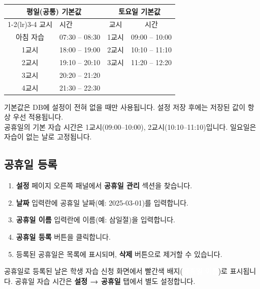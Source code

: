 \documentclass[a4paper,12pt]{article}
\newcommand{\menu}[1]{\textcolor{primary}{\textbf{#1}}}
\newcommand{\badge}[2]{\colorbox{#1}{\small\textcolor{white}{\textbf{#2}}}}
\begin{document}
\begin{center}
\begin{tabular}{clcc}
\toprule
\multicolumn{2}{c}{\textbf{평일(공통) 기본값}} & \multicolumn{2}{c}{\textbf{토요일 기본값}} \\
\cmidrule(lr){1-2}\cmidrule(lr){3-4}
교시 & 시간 & 교시 & 시간 \\
\midrule
아침 자습 & 07:30 -- 08:30 & 1교시 & 09:00 -- 10:00 \\
1교시     & 18:00 -- 19:00 & 2교시 & 10:10 -- 11:10 \\
2교시     & 19:10 -- 20:10 & 3교시 & 11:20 -- 12:20 \\
3교시     & 20:20 -- 21:20 &       &                 \\
4교시     & 21:30 -- 22:30 &       &                 \\
\bottomrule
\end{tabular}
\end{center}

\begin{notebox}
  기본값은 DB에 설정이 전혀 없을 때만 사용됩니다.
  설정 저장 후에는 저장된 값이 항상 우선 적용됩니다.\\
  공휴일의 기본 자습 시간은 1교시(09:00--10:00), 2교시(10:10--11:10)입니다.
  일요일은 자습이 없는 날로 고정됩니다.
\end{notebox}

\subsection{공휴일 등록}

\begin{enumerate}[leftmargin=1.5em]
    \item \menu{설정} 페이지 오른쪽 패널에서 \textbf{공휴일 관리} 섹션을 찾습니다.
    \item \textbf{날짜} 입력란에 공휴일 날짜(예: 2025-03-01)를 입력합니다.
    \item \textbf{공휴일 이름} 입력란에 이름(예: 삼일절)을 입력합니다.
    \item \menu{공휴일 등록} 버튼을 클릭합니다.
    \item 등록된 공휴일은 목록에 표시되며, \menu{삭제} 버튼으로 제거할 수 있습니다.
\end{enumerate}

\begin{tipbox}
  공휴일로 등록된 날은 학생 자습 신청 화면에서 빨간색 배지(\badge{danger}{공휴일 이름})로 표시됩니다.
  공휴일 자습 시간은 \menu{설정 → 공휴일} 탭에서 별도 설정합니다.
\end{tipbox}
\end{document}
